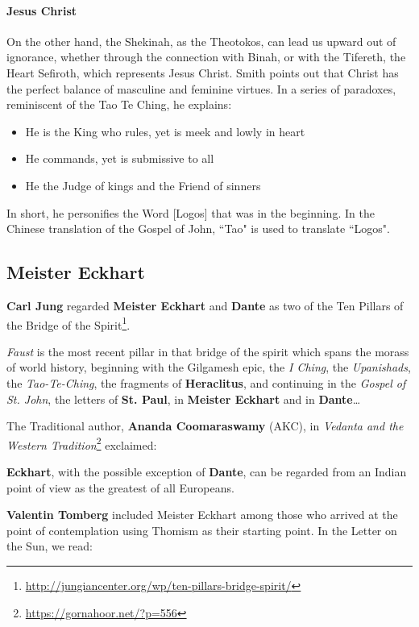 \paragraph{Jesus Christ}
On the other hand, the Shekinah, as the Theotokos, can lead us upward out of ignorance, whether through the connection with Binah, or with the Tifereth, the Heart Sefiroth, which represents Jesus Christ. Smith points out that Christ has the perfect balance of masculine and feminine virtues. In a series of paradoxes, reminiscent of the Tao Te Ching, he explains:

\begin{itemize}
\item He is the King who rules, yet is meek and lowly in heart 
\item He commands, yet is submissive to all 
\item He the Judge of kings and the Friend of sinners 
\end{itemize}
In short, he personifies the Word [Logos] that was in the beginning. In the Chinese translation of the Gospel of John, ``Tao" is used to translate ``Logos".

\subsection{Meister Eckhart}

\textbf{Carl Jung} regarded \textbf{Meister Eckhart} and \textbf{Dante} as two of the Ten Pillars of the Bridge of the Spirit\footnote{\url{http://jungiancenter.org/wp/ten-pillars-bridge-spirit/}}.

\begin{quotex}
\emph{Faust} is the most recent pillar in that bridge of the spirit which spans the morass of world history, beginning with the Gilgamesh epic, the \emph{I Ching}, the \emph{Upanishads}, the \emph{Tao-Te-Ching}, the fragments of \textbf{Heraclitus}, and continuing in the \emph{Gospel of St. John}, the letters of \textbf{St. Paul}, in \textbf{Meister Eckhart} and in \textbf{Dante}… 

\end{quotex}
The Traditional author, \textbf{Ananda Coomaraswamy} (AKC), in \textit{Vedanta and the Western Tradition}\footnote{\url{https://gornahoor.net/?p=556}} exclaimed:

\begin{quotex}
\textbf{Eckhart}, with the possible exception of \textbf{Dante}, can be regarded from an Indian point of view as the greatest of all Europeans. 

\end{quotex}
\textbf{Valentin Tomberg} included Meister Eckhart among those who arrived at the point of contemplation using Thomism as their starting point. In the Letter on the Sun, we read:

